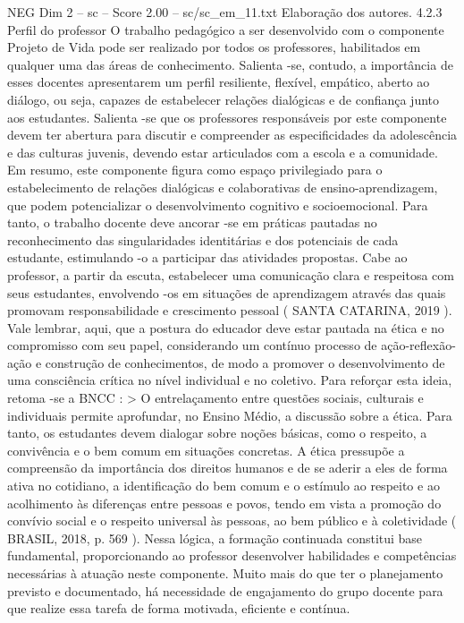\begin{textsample}{NEG Dim 2 – sc – Score 2.00 – sc/sc\_em\_11.txt}
Elaboração dos autores. 4.2.3 Perfil do professor O trabalho pedagógico a ser desenvolvido com o componente Projeto de Vida pode ser realizado por todos os professores, habilitados em qualquer uma das áreas de conhecimento.
Salienta -se, contudo, a importância de esses docentes apresentarem um perfil resiliente, flexível, empático, aberto ao diálogo, ou seja, capazes de estabelecer relações dialógicas e de confiança junto aos estudantes.
Salienta -se que os professores responsáveis por este componente devem ter abertura para discutir e compreender as especificidades da adolescência e das culturas juvenis, devendo estar articulados com a escola e a comunidade.
Em resumo, este componente figura como espaço privilegiado para o estabelecimento de relações dialógicas e colaborativas de ensino-aprendizagem, que podem potencializar o desenvolvimento cognitivo e socioemocional.
Para tanto, o trabalho docente deve ancorar -se em práticas pautadas no reconhecimento das singularidades identitárias e dos potenciais de cada estudante, estimulando -o a participar das atividades propostas.
Cabe ao professor, a partir da escuta, estabelecer uma comunicação clara e respeitosa com seus estudantes, envolvendo -os em situações de aprendizagem através das quais promovam responsabilidade e crescimento pessoal ( SANTA CATARINA, 2019 ).
Vale lembrar, aqui, que a postura do educador deve estar pautada na ética e no compromisso com seu papel, considerando um contínuo processo de ação-reflexão-ação e construção de conhecimentos, de modo a promover o desenvolvimento de uma consciência crítica no nível individual e no coletivo.
Para reforçar esta ideia, retoma -se a BNCC : > O entrelaçamento entre questões sociais, culturais e individuais permite aprofundar, no Ensino Médio, a discussão sobre a ética.
Para tanto, os estudantes devem dialogar sobre noções básicas, como o respeito, a convivência e o bem comum em situações concretas.
A ética pressupõe a compreensão da importância dos direitos humanos e de se aderir a eles de forma ativa no cotidiano, a identificação do bem comum e o estímulo ao respeito e ao acolhimento às diferenças entre pessoas e povos, tendo em vista a promoção do convívio social e o respeito universal às pessoas, ao bem público e à coletividade ( BRASIL, 2018, p. 569 ).
Nessa lógica, a formação continuada constitui base fundamental, proporcionando ao professor desenvolver habilidades e competências necessárias à atuação neste componente.
Muito mais do que ter o planejamento previsto e documentado, há necessidade de engajamento do grupo docente para que realize essa tarefa de forma motivada, eficiente e contínua.

\end{textsample}
